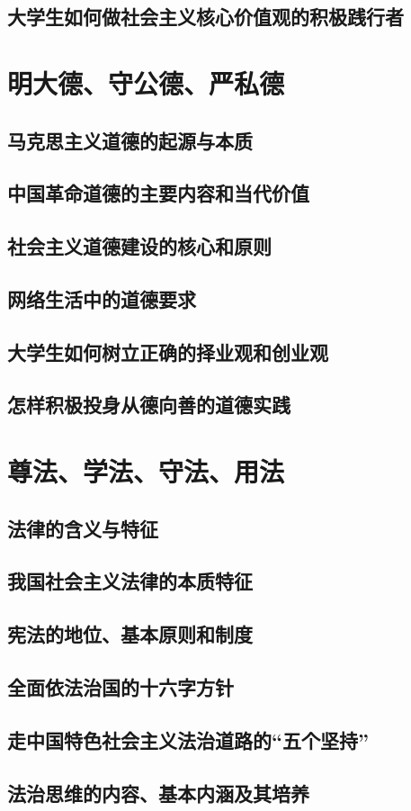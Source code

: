 \subsection{大学生如何做社会主义核心价值观的积极践行者}

\section{明大德、守公德、严私德}
\subsection{马克思主义道德的起源与本质}
\subsection{中国革命道德的主要内容和当代价值}
\subsection{社会主义道德建设的核心和原则}
\subsection{网络生活中的道德要求}
\subsection{大学生如何树立正确的择业观和创业观}
\subsection{怎样积极投身从德向善的道德实践}

\section{尊法、学法、守法、用法}
\subsection{法律的含义与特征}
\subsection{我国社会主义法律的本质特征}
\subsection{宪法的地位、基本原则和制度}
\subsection{全面依法治国的十六字方针}
\subsection{走中国特色社会主义法治道路的“五个坚持”}
\subsection{法治思维的内容、基本内涵及其培养}
